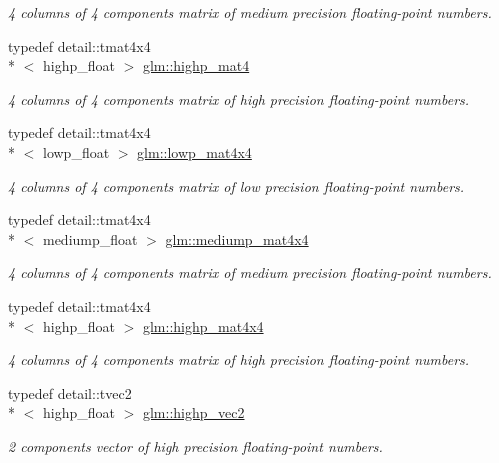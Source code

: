 \begin{DoxyCompactItemize}
\begin{DoxyCompactList}\small\item\em 4 columns of 4 components matrix of medium precision floating-\/point numbers. \end{DoxyCompactList}\item 
typedef detail\-::tmat4x4\\*
$<$ highp\-\_\-float $>$ \hyperlink{group__core__precision_gacab0d5de2ce45d2d2e08e4563a15377f}{glm\-::highp\-\_\-mat4}
\begin{DoxyCompactList}\small\item\em 4 columns of 4 components matrix of high precision floating-\/point numbers. \end{DoxyCompactList}\item 
typedef detail\-::tmat4x4\\*
$<$ lowp\-\_\-float $>$ \hyperlink{group__core__precision_gad3ab398e7b5115c5dcdbd497dea08664}{glm\-::lowp\-\_\-mat4x4}
\begin{DoxyCompactList}\small\item\em 4 columns of 4 components matrix of low precision floating-\/point numbers. \end{DoxyCompactList}\item 
typedef detail\-::tmat4x4\\*
$<$ mediump\-\_\-float $>$ \hyperlink{group__core__precision_ga6023cdb8df00d662cb6c1bce2632381a}{glm\-::mediump\-\_\-mat4x4}
\begin{DoxyCompactList}\small\item\em 4 columns of 4 components matrix of medium precision floating-\/point numbers. \end{DoxyCompactList}\item 
typedef detail\-::tmat4x4\\*
$<$ highp\-\_\-float $>$ \hyperlink{group__core__precision_gaa277c02de6192621d520335f0d2e4930}{glm\-::highp\-\_\-mat4x4}
\begin{DoxyCompactList}\small\item\em 4 columns of 4 components matrix of high precision floating-\/point numbers. \end{DoxyCompactList}\item 
typedef detail\-::tvec2\\*
$<$ highp\-\_\-float $>$ \hyperlink{group__core__precision_ga0747567a49e0fa00ecd05011c1645d69}{glm\-::highp\-\_\-vec2}
\begin{DoxyCompactList}\small\item\em 2 components vector of high precision floating-\/point numbers. \end{DoxyCompactList}\item 

\end{DoxyCompactItemize}
